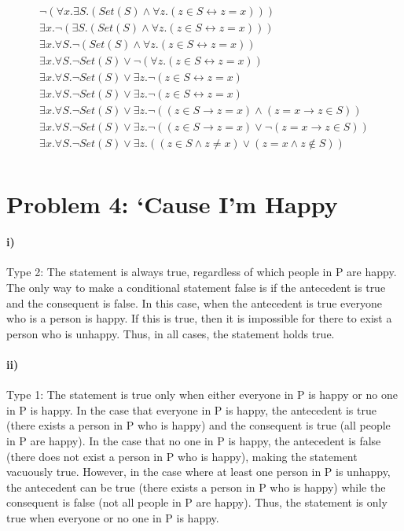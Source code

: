 \documentclass[10pt,letter]{article}
\begin{document}
\begin{enumerate}
\begin{gather*}
\neg(\forall x. \exists S. (Set(S) \wedge \forall z. (z \in S \leftrightarrow z = x)))\\
\exists x. \neg(\exists S. (Set(S) \wedge \forall z. (z \in S \leftrightarrow z = x)))\\
\exists x. \forall S. \neg(Set(S) \wedge \forall z. (z \in S \leftrightarrow z = x))\\\exists x. \forall S. \neg Set(S) \vee \neg(\forall z. (z \in S \leftrightarrow z = x))\\\exists x. \forall S. \neg Set(S) \vee \exists z. \neg(z \in S \leftrightarrow z = x)\\\exists x. \forall S. \neg Set(S) \vee \exists z. \neg(z \in S \leftrightarrow z = x)\\
\exists x. \forall S. \neg Set(S) \vee \exists z. \neg((z \in S \rightarrow z = x) \wedge (z = x \rightarrow z \in S))\\
\exists x. \forall S. \neg Set(S) \vee \exists z. \neg ((z \in S \rightarrow z = x) \vee \neg (z = x \rightarrow z \in S))\\
\exists x. \forall S. \neg Set(S) \vee \exists z. ((z \in S \wedge z \not = x) \vee (z = x \wedge z \not \in S))\\
\end{gather*}


\end{enumerate}

\section*{Problem 4: `Cause I'm Happy}

\paragraph{i)} Type 2: The statement is always true, regardless of which people in P are happy. The only way to make a conditional statement false is if the antecedent is true and the consequent is false. In this case, when the antecedent is true everyone who is a person is happy. If this is true, then it is impossible for there to exist a person who is unhappy. Thus, in all cases, the statement holds true.

\paragraph{ii)} Type 1: The statement is true only when either everyone in P is happy or no one in P is happy. In the case that everyone in P is happy, the antecedent is true (there exists a person in P who is happy) and the consequent is true (all people in P are happy). In the case that no one in P is happy, the antecedent is false (there does not exist a person in P who is happy), making the statement vacuously true. However, in the case where at least one person in P is unhappy, the antecedent can be true (there exists a person in P who is happy) while the consequent is false (not all people in P are happy). Thus, the statement is only true when everyone or no one in P is happy. 
\end{document}
